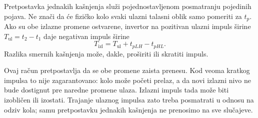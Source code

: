 
Pretpostavka jednakih kašnjenja služi pojednostavljenom posmatranju pojedinih pojava. Ne znači da će fizičko kolo svaki ulazni talasni oblik samo pomeriti za \(t_p\). Ako su obe izlazne promene ostvarene, invertor na pozitivan ulazni impuls širine \(T_{\mathrm{ul}}=t_2-t_1\) daje negativan impuls širine
\[
T_{\mathrm{izl}}=T_{\mathrm{ul}}+t_{pLH}-t_{pHL}.
\]
Razlika smernih kašnjenja može, dakle, proširiti ili skratiti impuls.

Ovaj račun pretpostavlja da se obe promene zaista prenesu. Kod veoma kratkog impulsa to nije zagarantovano: kolo može početi prelaz, a da novi izlazni nivo ne bude dostignut pre naredne promene ulaza. Izlazni impuls tada može biti izobličen ili izostati. Trajanje ulaznog impulsa zato treba posmatrati u odnosu na odziv kola; samu pretpostavku jednakih kašnjenja ne prenosimo na sve slučajeve.
